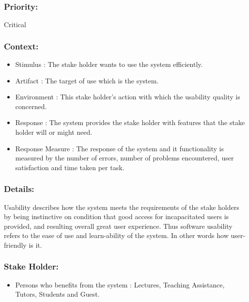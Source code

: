 \documentclass[11pt]{article}
\begin{document}
		\subsubsection{Priority:}
		\textbf{} Critical

		\subsubsection{Context:}
			\begin{itemize}
				\item Stimulus : The stake holder wants to use the system efficiently.
				\item Artifact : The target of use which is the system.
				\item Environment : This stake holder’s action with which the usability quality is concerned.
				\item Response : The system provides the stake holder with features that the stake holder will or might need.
				\item Response Measure : The response of the system and it functionality is measured by the number of errors, number of problems encountered, user satisfaction and time taken per task.
			\end{itemize}
		
		\subsubsection{Details:}
			\textbf{}Usability describes how the system meets the requirements of the stake holders by being instinctive on condition that good access for incapacitated users is provided, and resulting overall great user experience. Thus software usability refers to the ease of use and learn-ability of the system. In other words how user-friendly is it.  
		
		\subsubsection{Stake Holder:}
			\begin{itemize}
				\item Persons who benefits from the system : Lectures, Teaching Assistance, Tutors, Students and Guest.
			\end{itemize}
				
\end{document}
